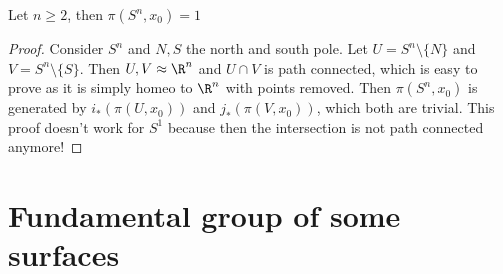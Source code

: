 \begin{corollary}
    Let $n \ge  2$, then $\pi(S^n, x_0) = 1$
\end{corollary}
\begin{proof}
    Consider $S^n$ and $N, S$ the north and south pole.
    Let $U = S^n \setminus \{N\} $ and $V = S^n \setminus \{S\}$.
    Then $U, V \approx \R^n$ and $U \cap V$ is path connected, which is easy to prove as it is simply homeo to $\R^n$ with points removed.
    Then $\pi(S^n, x_0)$ is generated by $i_*(\pi(U, x_0))$ and $j_*(\pi(V, x_0))$, which both are trivial.
    This proof doesn't work for $S^1$ because then the intersection is not path connected anymore!
\end{proof}

\section{Fundamental group of some surfaces}

